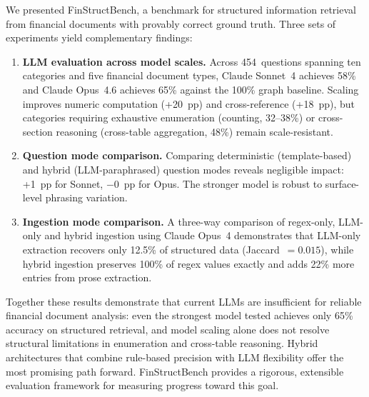 \documentclass[11pt]{article}
\begin{document}
We presented FinStructBench, a benchmark for structured information
retrieval from financial documents with provably correct ground truth.
Three sets of experiments yield complementary findings:

\begin{enumerate}[leftmargin=2em]
  \item \textbf{LLM evaluation across model scales.}  Across
    454~questions spanning ten categories and five financial document
    types, Claude Sonnet~4 achieves 58\% and Claude Opus~4.6 achieves
    65\% against the 100\% graph baseline.  Scaling improves
    numeric computation (+20~pp) and cross-reference (+18~pp), but
    categories requiring exhaustive enumeration (counting, 32--38\%)
    or cross-section reasoning (cross-table aggregation, 48\%)
    remain scale-resistant.
  \item \textbf{Question mode comparison.}  Comparing deterministic
    (template-based) and hybrid (LLM-paraphrased) question modes
    reveals negligible impact: +1~pp for Sonnet, $-$0~pp for Opus.
    The stronger model is robust to surface-level phrasing variation.
  \item \textbf{Ingestion mode comparison.}  A three-way comparison of
    regex-only, LLM-only and hybrid ingestion using Claude Opus~4
    demonstrates that LLM-only extraction recovers only 12.5\% of
    structured data (Jaccard~$= 0.015$), while hybrid ingestion preserves
    100\% of regex values exactly and adds 22\% more entries from prose
    extraction.
\end{enumerate}

\noindent
Together these results demonstrate that current LLMs are insufficient
for reliable financial document analysis: even the strongest model
tested achieves only 65\% accuracy on structured retrieval, and model
scaling alone does not resolve structural limitations in enumeration
and cross-table reasoning.  Hybrid architectures that combine
rule-based precision with LLM flexibility offer the most promising
path forward.  FinStructBench provides a rigorous, extensible
evaluation framework for measuring progress toward this goal.
\end{document}
